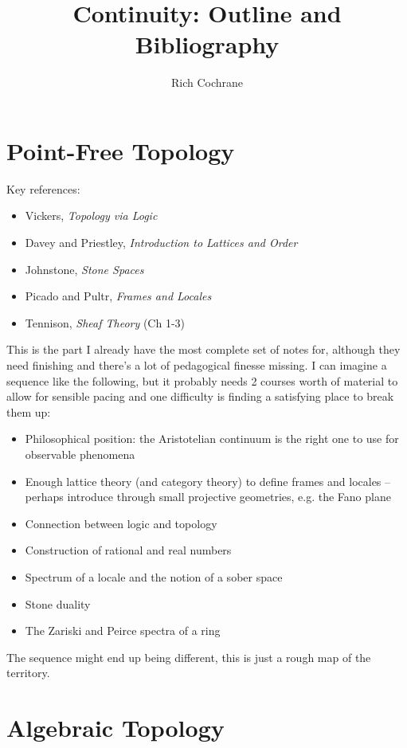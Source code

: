 \documentclass[article]{article}
\begin{document}
\title{Continuity: Outline and Bibliography}
\author{Rich Cochrane}
\maketitle

\section{Point-Free Topology}

Key references:
\begin{itemize}
	\item{Vickers, \emph{Topology via Logic}}
	\item{Davey and Priestley, \textit{Introduction to Lattices and Order}}
	\item{Johnstone, \emph{Stone Spaces}}
	\item{Picado and Pultr, \emph{Frames and Locales}}
	\item{Tennison, \emph{Sheaf Theory} (Ch 1-3)}
\end{itemize}


This is the part I already have the most complete set of notes for, although they need finishing and there's a lot of pedagogical finesse missing. I can imagine a sequence like the following, but it probably needs 2 courses worth of material to allow for sensible pacing and one difficulty is finding a satisfying place to break them up:
\begin{itemize}
	\item{Philosophical position: the Aristotelian continuum is the right one to use for observable phenomena}
	\item{Enough lattice theory (and category theory) to define frames and locales -- perhaps introduce through small projective geometries, e.g. the Fano plane}
	\item{Connection between logic and topology}
	\item{Construction of rational and real numbers}
	\item{Spectrum of a locale and the notion of a sober space}
	\item{Stone duality}
	\item{The Zariski and Peirce spectra of a ring}
\end{itemize}
The sequence might end up being different, this is just a rough map of the territory.

\section{Algebraic Topology}
\end{document}
